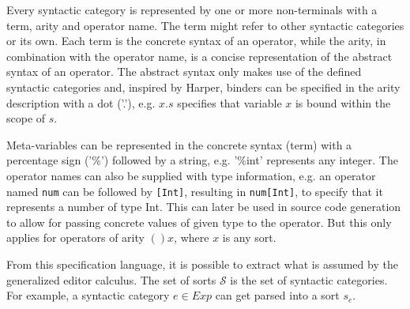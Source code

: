 \documentclass[sigplan,review]{acmart}
\begin{document}

Every syntactic category is represented by one or more non-terminals
with a term, arity and operator name. The term might refer to other
syntactic categories or its own. Each term is the concrete syntax of
an operator, while the arity, in combination with the operator name,
is a concise representation of the abstract syntax of an operator. 
The abstract syntax only makes use of the defined syntactic categories and, inspired by Harper\cite{harper_foundations}, binders can be specified in the arity description with a dot ('.'), e.g. $x.s$ specifies that variable $x$ is bound within the scope of $s$.

Meta-variables can be represented in the concrete syntax (term) with a percentage sign ('\%') followed by a string, e.g. '\%int' represents any integer. The operator
names can also be supplied with type information, e.g. an operator named
\texttt{num} can be followed by \texttt{[Int]}, resulting in \texttt{num[Int]}, to specify that it represents a number of type Int. This can later be used in source code generation to allow for passing concrete values of given type to the operator. But this only applies for operators of arity $()x$, where $x$ is any sort.

From this specification language, it is possible to extract what is assumed by the generalized editor calculus. The set of sorts $\mathcal{S}$ is the set of syntactic categories. For example, a syntactic category $e \in Exp$ can get parsed into a sort $s_{e}$.
\end{document}

